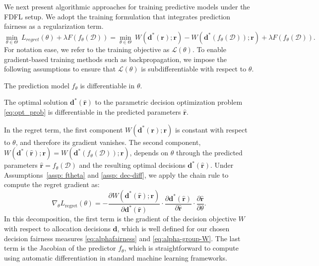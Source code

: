 \documentclass[ijoc,sglanonrev]{informs4}
\begin{document}
We next present algorithmic approaches for training predictive models under the FDFL setup. We adopt the training formulation that integrates prediction fairness as a regularization term. 
\begin{equation} \label{sys:fdfl-train}
     \min_{\theta \in \Theta}~ L_{regret}(\theta) + \lambda F(f_{\theta}(\mathcal{D})) = \min_{\theta \in \Theta}~ W(\mathbf{d^*}(\mathbf{r});\mathbf{r}) - W(\mathbf{d}^*(f_{\theta}(\mathcal{D}));\mathbf{r}) + \lambda F(f_{\theta}(\mathcal{D})).
\end{equation}
For notation ease, we refer to the training objective as $\mathcal{L}(\theta)$. To enable gradient-based training methods such as backpropagation, we impose the following assumptions to ensure that $\mathcal{L}(\theta)$ is subdifferentiable with respect to $\theta$.
\begin{assumption} \label{assp: ftheta}
The prediction model $f_{\theta}$ is differentiable in $\theta$.
\end{assumption}
\begin{assumption} \label{assp: dec-diff}
The optimal solution $\mathbf{d}^*(\hat{\mathbf{r}})$ to the parametric decision optimization problem \eqref{eq:opt_prob} is differentiable in the predicted parameters $\hat{\mathbf{r}}$.
\end{assumption}
In the regret term, the first component $W(\mathbf{d^*}(\mathbf{r});\mathbf{r})$ is constant with respect to $\theta$, and therefore its gradient vanishes. The second component, $W(\mathbf{d}^*(\hat{\mathbf{r}});\mathbf{r}) = W(\mathbf{d}^*(f_{\theta}(\mathcal{D}));\mathbf{r})$, depends on $\theta$ through the predicted parameters $\hat{\mathbf{r}} = f_{\theta}(\mathcal{D})$ and the resulting optimal decisions $\mathbf{d}^*(\hat{\mathbf{r}})$. Under Assumptions~\ref{assp: ftheta} and \ref{assp: dec-diff}, we apply the chain rule to compute the regret gradient as:
\begin{equation} \label{eq:grad-chain-regret}
\nabla_{\theta} L_{\text{regret}}(\theta) = -\frac{\partial W(\mathbf{d}^*(\hat{\mathbf{r}});\mathbf{r})}{\partial \mathbf{d}^*(\hat{\mathbf{r}})} \cdot \frac{\partial \mathbf{d}^*(\hat{\mathbf{r}})}{\partial \hat{\mathbf{r}}} \cdot \frac{\partial \hat{\mathbf{r}}}{\partial \theta}.
\end{equation}
In this decomposition, the first term is the gradient of the decision objective $W$ with respect to allocation decisions $\mathbf{d}$, which is well defined for our chosen decision fairness measures \eqref{eq:alphafairness} and \eqref{eq:alpha-group-W}. The last term is the Jacobian of the predictor $f_{\theta}$, which is straightforward to compute using automatic differentiation in standard machine learning frameworks. 
\end{document}
